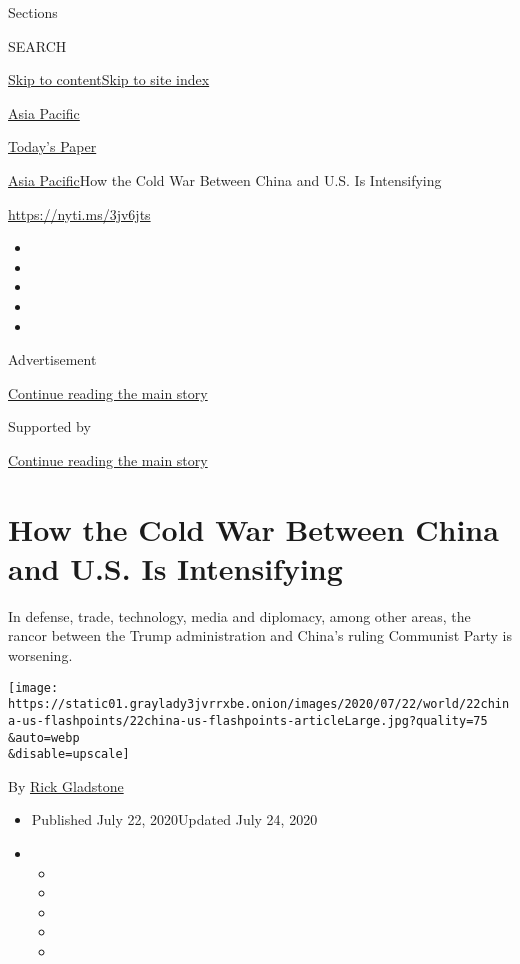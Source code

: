 Sections

SEARCH

\protect\hyperlink{site-content}{Skip to
content}\protect\hyperlink{site-index}{Skip to site index}

\href{https://www.nytimes3xbfgragh.onion/section/world/asia}{Asia
Pacific}

\href{https://myaccount.nytimes3xbfgragh.onion/auth/login?response_type=cookie\&client_id=vi}{}

\href{https://www.nytimes3xbfgragh.onion/section/todayspaper}{Today's
Paper}

\href{/section/world/asia}{Asia Pacific}\textbar{}How the Cold War
Between China and U.S. Is Intensifying

\href{https://nyti.ms/3jv6jts}{https://nyti.ms/3jv6jts}

\begin{itemize}
\item
\item
\item
\item
\item
\end{itemize}

Advertisement

\protect\hyperlink{after-top}{Continue reading the main story}

Supported by

\protect\hyperlink{after-sponsor}{Continue reading the main story}

\hypertarget{how-the-cold-war-between-china-and-us-is-intensifying}{%
\section{How the Cold War Between China and U.S. Is
Intensifying}\label{how-the-cold-war-between-china-and-us-is-intensifying}}

In defense, trade, technology, media and diplomacy, among other areas,
the rancor between the Trump administration and China's ruling Communist
Party is worsening.

\texttt{[image: https://static01.graylady3jvrrxbe.onion/images/2020/07/22/world/22china-us-flashpoints/22china-us-flashpoints-articleLarge.jpg?quality=75\\\&auto=webp\\\&disable=upscale]}

By \href{https://www.nytimes3xbfgragh.onion/by/rick-gladstone}{Rick
Gladstone}

\begin{itemize}
\item
  Published July 22, 2020Updated July 24, 2020
\item
  \begin{itemize}
  \item
  \item
  \item
  \item
  \item
  \end{itemize}
\end{itemize}

